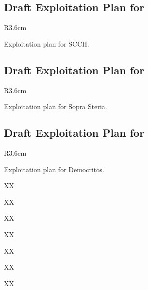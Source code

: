 \documentclass[a4paper,11pt]{article}
\begin{document}
\horizontalline

\subsection*{Draft Exploitation Plan for \SCCHshort{}}
\vspace{-6pt}

\begin{wrapfigure}{R}{3.6cm}
\vspace{-1.3cm}
\hfill {}
\vspace{-0.8cm}
\end{wrapfigure}

Exploitation plan for SCCH.

\horizontalline

\subsection*{Draft Exploitation Plan for \SOPRAshort{}}
\vspace{-6pt}

\begin{wrapfigure}{R}{3.6cm}
\vspace{-1.3cm}
\hfill {}
\vspace{-0.8cm}
\end{wrapfigure}

Exploitation plan for Sopra Steria.

\horizontalline

\subsection*{Draft Exploitation Plan for \DEMshort{}}
\vspace{-6pt}

\begin{wrapfigure}{R}{3.6cm}
\vspace{-1.3cm}
\hfill {}
\vspace{-0.8cm}
\end{wrapfigure}

Exploitation plan for Democritos.

XX

XX

XX

XX

XX

XX

XX
\end{document}
